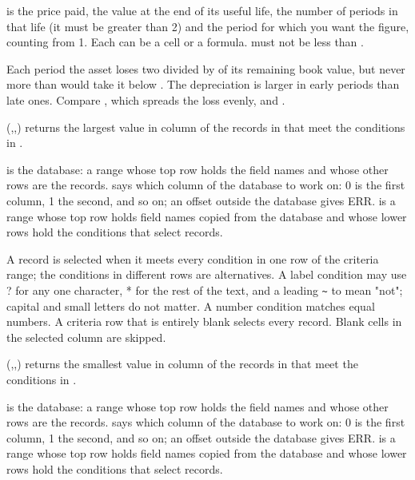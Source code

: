  is the price paid,  the value at the end of its useful life,  the number of periods in that life (it must be greater than 2) and  the period for which you want the figure, counting from 1. Each can be a cell or a formula.  must not be less than .

Each period the asset loses two divided by  of its remaining book value, but never more than would take it below . The depreciation is larger in early periods than late ones. Compare , which spreads the loss evenly, and .

\Examples
{}

(,,) returns the largest value in column  of the records in  that meet the conditions in .

 is the database: a range whose top row holds the field names and whose other rows are the records.  says which column of the database to work on: 0 is the first column, 1 the second, and so on; an offset outside the database gives ERR.  is a range whose top row holds field names copied from the database and whose lower rows hold the conditions that select records.

A record is selected when it meets every condition in one row of the criteria range; the conditions in different rows are alternatives. A label condition may use ? for any one character, * for the rest of the text, and a leading \texttt{\textasciitilde} to mean "not"; capital and small letters do not matter. A number condition matches equal numbers. A criteria row that is entirely blank selects every record. Blank cells in the selected column are skipped.

\Examples
{}

(,,) returns the smallest value in column  of the records in  that meet the conditions in .

 is the database: a range whose top row holds the field names and whose other rows are the records.  says which column of the database to work on: 0 is the first column, 1 the second, and so on; an offset outside the database gives ERR.  is a range whose top row holds field names copied from the database and whose lower rows hold the conditions that select records.

